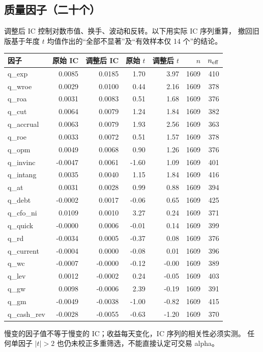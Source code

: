\documentclass[UTF8,10pt,a4paper]{ctexart}
\begin{document}
\subsection{质量因子（二十个）}
调整后 IC 控制对数市值、换手、波动和反转。以下用实际 IC 序列重算，
撤回旧版基于年度 $t$ 均值作出的“全部不显著”及“有效样本仅 14 个”的结论。
{\small
\begin{longtable}{@{}lrrrrrr@{}}
\toprule
因子 & 原始 IC & 调整后 IC & 原始 $t$ & 调整后 $t$ & $n$ & $n_{\rm eff}$ \\
\midrule
\endhead
q\_exp & 0.0085 & 0.0185 & 1.70 & 3.97 & 1609 & 410 \\
q\_wroe & 0.0029 & 0.0100 & 0.44 & 2.16 & 1609 & 378 \\
q\_roa & 0.0031 & 0.0083 & 0.51 & 1.68 & 1609 & 376 \\
q\_cut & 0.0064 & 0.0079 & 1.24 & 1.84 & 1609 & 382 \\
q\_accrual & 0.0063 & 0.0079 & 1.93 & 2.56 & 1609 & 363 \\
q\_roe & 0.0033 & 0.0072 & 0.51 & 1.57 & 1609 & 378 \\
q\_opm & 0.0049 & 0.0068 & 0.90 & 1.26 & 1609 & 376 \\
q\_invinc & -0.0047 & 0.0061 & -1.60 & 1.09 & 1609 & 401 \\
q\_intang & 0.0035 & 0.0040 & 1.15 & 1.84 & 1609 & 416 \\
q\_at & 0.0031 & 0.0028 & 0.99 & 0.88 & 1609 & 394 \\
q\_debt & -0.0002 & 0.0017 & -0.06 & 0.65 & 1609 & 425 \\
q\_cfo\_ni & 0.0109 & 0.0010 & 3.27 & 0.24 & 1609 & 371 \\
q\_quick & -0.0000 & 0.0006 & -0.01 & 0.14 & 1609 & 399 \\
q\_rd & -0.0034 & 0.0005 & -0.37 & 0.08 & 1609 & 376 \\
q\_current & -0.0004 & 0.0000 & -0.08 & 0.01 & 1609 & 396 \\
q\_wc & -0.0007 & -0.0000 & -0.12 & -0.00 & 1609 & 389 \\
q\_lev & 0.0012 & -0.0002 & 0.24 & -0.05 & 1609 & 403 \\
q\_gw & 0.0098 & -0.0006 & 2.39 & -0.19 & 1609 & 391 \\
q\_gm & -0.0049 & -0.0038 & -1.00 & -0.82 & 1609 & 415 \\
q\_cash\_rev & -0.0028 & -0.0055 & -0.63 & -1.20 & 1609 & 370 \\
\bottomrule
\end{longtable}
}
慢变的因子值不等于慢变的 IC；收益每天变化，IC 序列的相关性必须实测。
任何单因子 $|t|>2$ 也仍未校正多重筛选，不能直接认定可交易 alpha。
\end{document}
